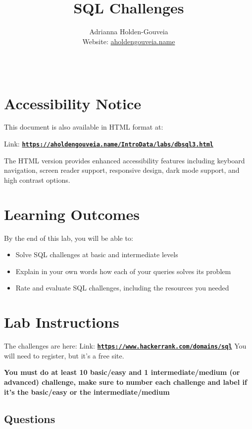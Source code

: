\documentclass[12pt]{article}
\title{SQL Challenges}
\author{
        Adrianna Holden-Gouveia \\
        Website: \href{https://aholdengouveia.name}{aholdengouveia.name}\\ 
        \date{\vspace{-5ex}}
        \faGithub {: aholdengouveia} \\
        }
\begin{document}
    

\maketitle



\section*{Accessibility Notice}
This document is also available in HTML format at:

Link: \href{https://aholdengouveia.name/IntroData/labs/dbsql3.html}{\textbf{\nolinkurl{https://aholdengouveia.name/IntroData/labs/dbsql3.html}}}

The HTML version provides enhanced accessibility features including keyboard navigation, screen reader support, responsive design, dark mode support, and high contrast options.

\section*{Learning Outcomes}
By the end of this lab, you will be able to:
\begin{itemize}
    \item Solve SQL challenges at basic and intermediate levels
    \item Explain in your own words how each of your queries solves its problem
    \item Rate and evaluate SQL challenges, including the resources you needed
\end{itemize}

\section*{Lab Instructions}


The challenges are here: Link: \href{https://www.hackerrank.com/domains/sql}{\textbf{\nolinkurl{https://www.hackerrank.com/domains/sql}}} You will need to register, but it's a free site. 


\textbf{You must do at least 10 basic/easy and 1 intermediate/medium (or advanced) challenge, make sure to number each challenge and label if it's the basic/easy or the intermediate/medium}

\subsection*{Questions}
\end{document}
